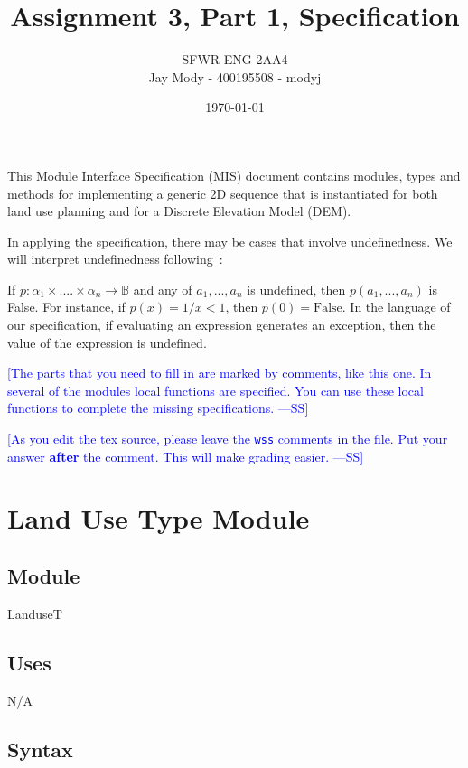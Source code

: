 \documentclass[12pt]{article}
\title{Assignment 3, Part 1, Specification}
\author{SFWR ENG 2AA4\\Jay Mody - 400195508 - modyj}
\date{\today}
\newcommand{\authornote}[3]{\textcolor{#1}{[#3 ---#2]}}
\newcommand{\authornote}[3]{}
\newcommand{\wss}[1]{\authornote{blue}{SS}{#1}}
\begin{document}
\maketitle
This Module Interface Specification (MIS) document contains modules, types and
methods for implementing a generic 2D sequence that is instantiated for both
land use planning and for a Discrete Elevation Model (DEM).

In applying the specification, there may be cases that involve undefinedness.
We will interpret undefinedness following~\cite{Farmer2004}:

If $p: \alpha_1 \times .... \times \alpha_n \rightarrow \mathbb{B}$ and any of
$a_1, ..., a_n$ is undefined, then $p(a_1, ..., a_n)$ is False.  For instance,
if $p(x) = 1/x < 1$, then $p(0) = \text{False}$.  In the language of our
specification, if evaluating an expression generates an exception, then the
value of the expression is undefined.

\wss{The parts that you need to fill in are marked by comments, like this one.
  In several of the modules local functions are specified.  You can use these
  local functions to complete the missing specifications.}

\wss{As you edit the tex source, please leave the \texttt{wss} comments in the
  file.  Put your answer \textbf{after} the comment.  This will make grading
  easier.}




\newpage

\section* {Land Use Type Module}

\subsection*{Module}

LanduseT

\subsection* {Uses}

N/A

\subsection* {Syntax}
\end{document}
